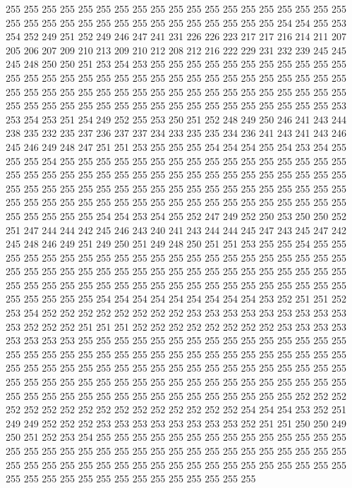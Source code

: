 255 255 255 255 255 255 255 255 255 255 255 255 255 255 255 255 255 255 255 255
255 255 255 255 255 255 255 255 255 255 255 255 255 255 254 254 255 253 254 252
249 251 252 249 246 247 241 231 226 226 223 217 217 216 214 211 207 205 206 207
209 210 213 209 210 212 208 212 216 222 229 231 232 239 245 245 245 248 250 250
251 253 254 253 255 255 255 255 255 255 255 255 255 255 255 255 255 255 255 255
255 255 255 255 255 255 255 255 255 255 255 255 255 255 255 255 255 255 255 255
255 255 255 255 255 255 255 255 255 255 255 255 255 255 255 255 255 255 255 255
255 255 255 255 255 255 255 255 255 255 255 253 253 254 253 251 254 249 252 255
253 250 251 252 248 249 250 246 241 243 244 238 235 232 235 237 236 237 237 234
233 235 235 234 236 241 243 241 243 246 245 246 249 248 247 251 251 253 255 255
255 254 254 254 255 254 253 254 255 255 255 254 255 255 255 255 255 255 255 255
255 255 255 255 255 255 255 255 255 255 255 255 255 255 255 255 255 255 255 255
255 255 255 255 255 255 255 255 255 255 255 255 255 255 255 255 255 255 255 255
255 255 255 255 255 255 255 255 255 255 255 255 255 255 255 255 255 255 255 255
255 255 255 255 255 255 255 255 255 255 254 254 253 254 255 252 247 249 252 250
253 250 250 252 251 247 244 244 242 245 246 243 240 241 243 244 244 245 247 243
245 247 242 245 248 246 249 251 249 250 251 249 248 250 251 251 253 255 255 254
255 255 255 255 255 255 255 255 255 255 255 255 255 255 255 255 255 255 255 255
255 255 255 255 255 255 255 255 255 255 255 255 255 255 255 255 255 255 255 255
255 255 255 255 255 255 255 255 255 255 255 255 255 255 255 255 255 255 255 255
255 255 255 255 254 254 254 254 254 254 254 254 254 253 252 251 251 252 253 254
252 252 252 252 252 252 252 252 253 253 253 253 253 253 253 253 253 253 252 252
252 251 251 251 252 252 252 252 252 252 252 252 253 253 253 253 253 253 253 253
255 255 255 255 255 255 255 255 255 255 255 255 255 255 255 255 255 255 255 255
255 255 255 255 255 255 255 255 255 255 255 255 255 255 255 255 255 255 255 255
255 255 255 255 255 255 255 255 255 255 255 255 255 255 255 255 255 255 255 255
255 255 255 255 255 255 255 255 255 255 255 255 255 255 255 255 255 255 255 255
255 255 255 255 255 255 255 255 252 252 252 252 252 252 252 252 252 252 252 252
252 252 252 252 254 254 254 253 252 251 249 249 252 252 252 253 253 253 253 253
253 253 253 252 251 251 250 250 249 250 251 252 253 254 255 255 255 255 255 255
255 255 255 255 255 255 255 255 255 255 255 255 255 255 255 255 255 255 255 255
255 255 255 255 255 255 255 255 255 255 255 255 255 255 255 255 255 255 255 255
255 255 255 255 255 255 255 255 255 255 255 255 255 255 255 255 255 255 255 255
